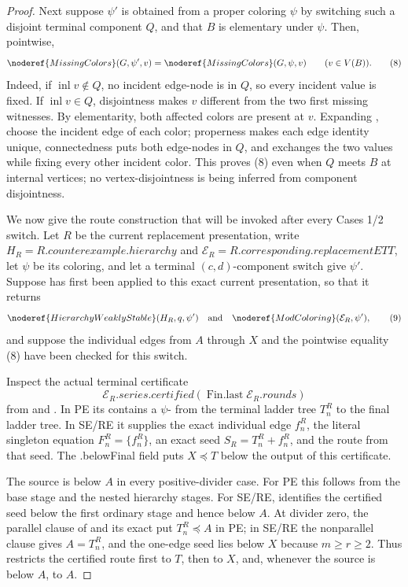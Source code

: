 \begin{proof}
Next suppose \(\psi'\) is obtained from a proper coloring \(\psi\) by
switching such a disjoint terminal component \(Q\), and that \(B\) is
elementary under \(\psi\).  Then, pointwise,
\[
 \noderef{MissingColors}(G,\psi',v)=
 \noderef{MissingColors}(G,\psi,v)\qquad(v\in V(B)).             \tag{8}
\]
Indeed, if \(\operatorname{inl}v\notin Q\), no incident edge-node is in
\(Q\), so every incident value is fixed.  If
\(\operatorname{inl}v\in Q\), disjointness makes \(v\) different from the
two first missing witnesses.  By elementarity, both affected colors are
present at \(v\).  Expanding , choose the incident
edge of each color; properness makes each edge identity unique, connectedness
puts both edge-nodes in \(Q\), and  exchanges
the two values while fixing every other incident color.  This proves (8)
even when \(Q\) meets \(B\) at internal vertices; no vertex-disjointness is
being inferred from component disjointness.

We now give the route construction that will be invoked after every
Cases 1/2 switch.  Let \(R\) be the current replacement presentation, write
\(H_R=R.\mathit{counterexample}.\mathit{hierarchy}\) and
\(\mathcal E_R=R.\mathit{corresponding}.\mathit{replacementETT}\), let
\(\psi\) be its coloring, and let a terminal \((c,d)\)-component switch give
\(\psi'\).  Suppose  has first been
applied to this exact current presentation, so that it returns
\[
 \noderef{HierarchyWeaklyStable}(H_R,q,\psi')\quad\hbox{and}\quad
 \noderef{ModColoring}(\mathcal E_R,\psi'),                    \tag{9}
\]
and suppose the individual edges from \(A\) through \(X\) and the
pointwise equality (8) have been checked for this switch.

Inspect the actual terminal certificate
\[
 \mathcal E_R.\mathit{series}.\mathit{certified}
       (\operatorname{Fin.last}\mathcal E_R.\mathit{rounds})
\]
from  and
.  In PE its
 contains a \(\psi\)-
 from the terminal ladder tree
\(T_n^R\) to the final ladder tree.  In SE/RE it supplies the exact
individual edge \(f_n^R\), the literal singleton equation
\(F_n^R=\{f_n^R\}\), an exact
 seed \(S_R=T_n^R+f_n^R\), and the route
from that seed.  The .belowFinal field puts
\(X\preccurlyeq T\) below the output of this certificate.

The source is below \(A\) in every positive-divider case.  For PE this
follows from the base stage and the nested hierarchy stages.  For SE/RE,
 identifies the certified seed
below the first ordinary stage and hence below \(A\).  At divider zero,
the parallel clause of  and its exact
 put \(T_n^R\preccurlyeq A\) in PE; in SE/RE the
nonparallel clause gives \(A=T_n^R\), and the one-edge seed lies below
\(X\) because \(m\geq r\geq2\).  Thus
 restricts the certified
route first to \(T\), then to \(X\), and, whenever the source is below
\(A\), to \(A\).


\end{proof}
